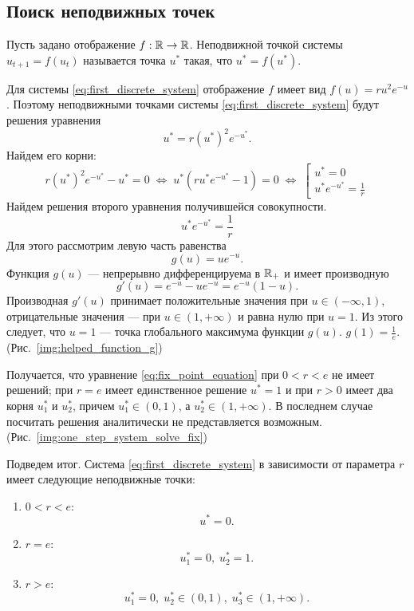 \subsection{Поиск неподвижных точек}

\begin{definition}
    Пусть задано отображение $f:\mathbb{R}\rightarrow\mathbb{R}$. Неподвижной точкой системы $u_{t+1} = f(u_t)$ называется точка $u^*$ такая, что $u^* = f(u^*)$. \cite[стр.~82]{bratus10}
\end{definition}

Для системы \ref{eq:first_discrete_system} отображение $f$ имеет вид $f(u)=r u^2 e^{-u}$. Поэтому неподвижными точками системы \ref{eq:first_discrete_system} будут решения уравнения
\begin{equation}\label{OneStepFind}
        u^* = r (u^*)^2 e^{-u^*}.
\end{equation}
Найдем его корни:
$$
    r(u^*)^2e^{-u^*} - u^* = 0
    \;
    \Longleftrightarrow
    \;
    u^* (r u^* e^{-u^*} - 1) = 0
    \;
    \Longleftrightarrow
    \;
    \left[
    \begin{gathered}
        u^* = 0 \\
        u^* e^{-u^*} = \frac{1}{r}
    \end{gathered}
    \right.
$$
Найдем решения второго уравнения получившейся совокупности.
\begin{equation}\label{eq:fix_point_equation}
    u^* e^{-u^*} = \frac{1}{r}
\end{equation}
Для этого рассмотрим левую часть равенства 
$$
    g(u) = u e^{-u}.
$$
    Функция $g(u)$ --- непрерывно дифференцируема в $\mathbb{R}_+$ и имеет производную
$$
    g'(u) = e^{-u} - u e^{-u} = e^{-u} (1 - u).
$$
Производная $g'(u)$ принимает положительные значения при $u \in (-\infty, 1)$, отрицательные значения --- при $u \in (1, +\infty)$ и равна нулю при $u = 1$. Из этого следует, что $u = 1$ --- точка глобального максимума функции $g(u)$. $g(1) = \frac{1}{e}$. (Рис.~\ref{img:helped_function_g})



Получается, что уравнение \ref{eq:fix_point_equation} при $0 < r < e$ не имеет решений; при $r = e$ имеет единственное решение $u^* = 1$ и при $r > 0$ имеет два корня $u^*_1$ и $u^*_2$, причем $u^*_1 \in (0, 1)$, а $u^*_2 \in (1, +\infty)$. В последнем случае посчитать решения аналитически не представляется возможным. (Рис.~\ref{img:one_step_system_solve_fix})


            
Подведем итог. Система \ref{eq:first_discrete_system} в зависимости от параметра $r$ имеет следующие неподвижные точки:
\begin{enumerate}
    \item $0 < r < e$:
    $$
        u^* = 0.
    $$
    \item $r = e$:
    $$
        u^*_1 = 0, \; u^*_2 = 1.
    $$
    \item $r > e$:
    $$
        u^*_1 = 0, \; u^*_2 \in (0, 1), \; u^*_3 \in (1, +\infty).
    $$
\end{enumerate}

